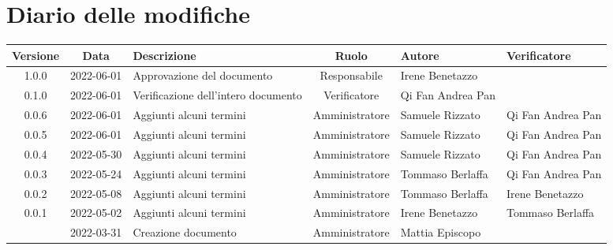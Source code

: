 \section*{Diario delle modifiche}
	\begin{center}
	\renewcommand{\arraystretch}{1.8} %
	\begin{longtable}{ |c|c|p{8em}|c|m{5em}|m{6em}| }
	\hline
	\textbf{Versione} & \textbf{Data} & \textbf{Descrizione} &  \textbf{Ruolo} &  \textbf{Autore} & \textbf{Verificatore}\\ %
	\hline %
	1.0.0 & 2022-06-01 & Approvazione del documento & Responsabile & Irene \newline Benetazzo & \\
	\hline
	0.1.0 & 2022-06-01 & Verificazione dell'intero documento & Verificatore & Qi Fan \newline Andrea Pan & \\
	\hline
	0.0.6 & 2022-06-01 & Aggiunti alcuni termini & Amministratore & Samuele \newline Rizzato &Qi Fan \newline Andrea Pan \\
	\hline
	0.0.5 & 2022-06-01 & Aggiunti alcuni termini & Amministratore & Samuele \newline Rizzato &Qi Fan \newline Andrea Pan \\
	\hline
	0.0.4 & 2022-05-30 & Aggiunti alcuni termini & Amministratore & Samuele \newline Rizzato & Qi Fan \newline Andrea Pan\\
	\hline
	0.0.3 & 2022-05-24 & Aggiunti alcuni termini & Amministratore & Tommaso \newline Berlaffa & Qi Fan \newline Andrea Pan\\
	\hline
	0.0.2 & 2022-05-08 & Aggiunti alcuni termini & Amministratore & Tommaso \newline Berlaffa & Irene \newline Benetazzo\\
	\hline
	0.0.1 & 2022-05-02 & Aggiunti alcuni termini & Amministratore & Irene \newline Benetazzo & Tommaso \newline Berlaffa\\
	\hline
  	& 2022-03-31 & Creazione documento & Amministratore & Mattia \newline Episcopo & \\ 
	\hline
	\end{longtable}
	\end{center}
	\newpage